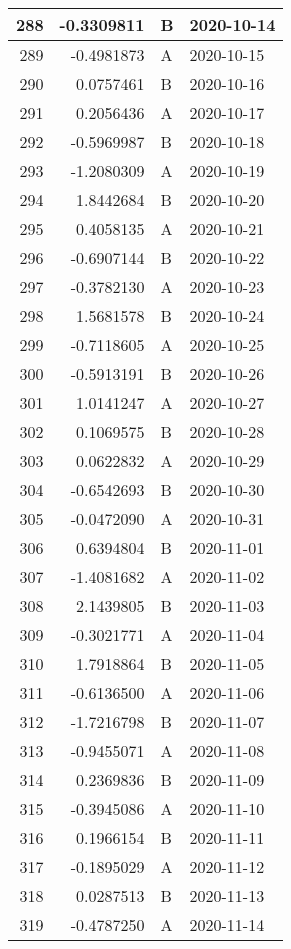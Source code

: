 \begin{tabular}{r|r|l|l}
\hline
288 & -0.3309811 & B & 2020-10-14\\
\hline
289 & -0.4981873 & A & 2020-10-15\\
\hline
290 & 0.0757461 & B & 2020-10-16\\
\hline
291 & 0.2056436 & A & 2020-10-17\\
\hline
292 & -0.5969987 & B & 2020-10-18\\
\hline
293 & -1.2080309 & A & 2020-10-19\\
\hline
294 & 1.8442684 & B & 2020-10-20\\
\hline
295 & 0.4058135 & A & 2020-10-21\\
\hline
296 & -0.6907144 & B & 2020-10-22\\
\hline
297 & -0.3782130 & A & 2020-10-23\\
\hline
298 & 1.5681578 & B & 2020-10-24\\
\hline
299 & -0.7118605 & A & 2020-10-25\\
\hline
300 & -0.5913191 & B & 2020-10-26\\
\hline
301 & 1.0141247 & A & 2020-10-27\\
\hline
302 & 0.1069575 & B & 2020-10-28\\
\hline
303 & 0.0622832 & A & 2020-10-29\\
\hline
304 & -0.6542693 & B & 2020-10-30\\
\hline
305 & -0.0472090 & A & 2020-10-31\\
\hline
306 & 0.6394804 & B & 2020-11-01\\
\hline
307 & -1.4081682 & A & 2020-11-02\\
\hline
308 & 2.1439805 & B & 2020-11-03\\
\hline
309 & -0.3021771 & A & 2020-11-04\\
\hline
310 & 1.7918864 & B & 2020-11-05\\
\hline
311 & -0.6136500 & A & 2020-11-06\\
\hline
312 & -1.7216798 & B & 2020-11-07\\
\hline
313 & -0.9455071 & A & 2020-11-08\\
\hline
314 & 0.2369836 & B & 2020-11-09\\
\hline
315 & -0.3945086 & A & 2020-11-10\\
\hline
316 & 0.1966154 & B & 2020-11-11\\
\hline
317 & -0.1895029 & A & 2020-11-12\\
\hline
318 & 0.0287513 & B & 2020-11-13\\
\hline
319 & -0.4787250 & A & 2020-11-14\\

\end{tabular}
